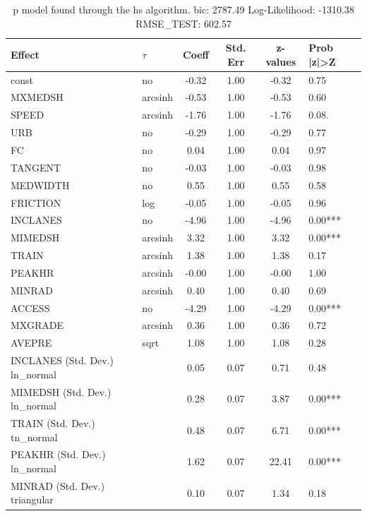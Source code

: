 \begin{table}
	\caption{p model found through the hs algorithm. bic: 2787.49 Log-Likelihood: -1310.38 RMSE_TEST: 602.57}
	\begin{center}
		\begin{tabular}{|l|l|c|c|c|l|}
			\hline
			Effect & $\tau$ & Coeff & Std. Err & z-values & Prob |z|>Z \\
			\hline
			const & no & -0.32 & 1.00 & -0.32 & 0.75 \\
			\hline
			MXMEDSH & arcsinh & -0.53 & 1.00 & -0.53 & 0.60 \\
			\hline
			SPEED & arcsinh & -1.76 & 1.00 & -1.76 & 0.08. \\
			\hline
			URB & no & -0.29 & 1.00 & -0.29 & 0.77 \\
			\hline
			FC & no & 0.04 & 1.00 & 0.04 & 0.97 \\
			\hline
			TANGENT & no & -0.03 & 1.00 & -0.03 & 0.98 \\
			\hline
			MEDWIDTH & no & 0.55 & 1.00 & 0.55 & 0.58 \\
			\hline
			FRICTION & log & -0.05 & 1.00 & -0.05 & 0.96 \\
			\hline
			INCLANES & no & -4.96 & 1.00 & -4.96 & 0.00*** \\
			\hline
			MIMEDSH & arcsinh & 3.32 & 1.00 & 3.32 & 0.00*** \\
			\hline
			TRAIN & arcsinh & 1.38 & 1.00 & 1.38 & 0.17 \\
			\hline
			PEAKHR & arcsinh & -0.00 & 1.00 & -0.00 & 1.00 \\
			\hline
			MINRAD & arcsinh & 0.40 & 1.00 & 0.40 & 0.69 \\
			\hline
			ACCESS & no & -4.29 & 1.00 & -4.29 & 0.00*** \\
			\hline
			MXGRADE & arcsinh & 0.36 & 1.00 & 0.36 & 0.72 \\
			\hline
			AVEPRE & sqrt & 1.08 & 1.00 & 1.08 & 0.28 \\
			\hline
			INCLANES (Std. Dev.) ln_normal &  & 0.05 & 0.07 & 0.71 & 0.48 \\
			\hline
			MIMEDSH (Std. Dev.) ln_normal &  & 0.28 & 0.07 & 3.87 & 0.00*** \\
			\hline
			TRAIN (Std. Dev.) tn_normal &  & 0.48 & 0.07 & 6.71 & 0.00*** \\
			\hline
			PEAKHR (Std. Dev.) ln_normal &  & 1.62 & 0.07 & 22.41 & 0.00*** \\
			\hline
			MINRAD (Std. Dev.) triangular &  & 0.10 & 0.07 & 1.34 & 0.18 \\

\end{tabular}
\end{center}
\end{table}
